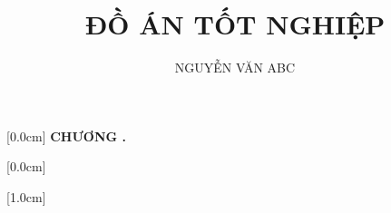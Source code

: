 \documentclass[a4paper, oneside]{report}
\title{\bf ĐỒ ÁN TỐT NGHIỆP} %
\author{NGUYỄN VĂN ABC} %
\theoremstyle{plain}
\theoremstyle{definition}
\theoremstyle{remark}
\begin{document}
	
	\pagestyle{plain} %
	
	\newpage
	
	
	\newpage
	
	
	\newpage
	\renewcommand*\contentsname{MỤC LỤC}
	
	
	[0.0cm]             %
	{\bfseries\vspace{0.3cm}}                  %
	{{\bfseries{\scshape}
			CHƯƠNG \thecontentslabel.\ }}
	{}         %
	{\contentspage}         %
	
	
	[0.0cm]             %
	{\vspace{0.3cm}}                  %
	{\thecontentslabel \ } %
	{}         %
	{\contentspage}         %
	
	[1.0cm]             %
	{\vspace{0.3cm}}                  %
	{\thecontentslabel \ } %
	{}         %
	{\contentspage}         %
	
	\tableofcontents
	\thispagestyle{empty}
	\cleardoublepage
	
	\newpage
	\renewcommand{\listfigurename}{DANH MỤC HÌNH VẼ}
	{\let\oldnumberline\numberline
		\renewcommand{\numberline}{Hình~\oldnumberline}
		\listoffigures} 
		
	
	\renewcommand{\listtablename}{DANH MỤC BẢNG BIỂU}
	{\let\oldnumberline\numberline
		\renewcommand{\numberline}{Bảng~\oldnumberline}
		\listoftables}
	
	
	
\end{document}

